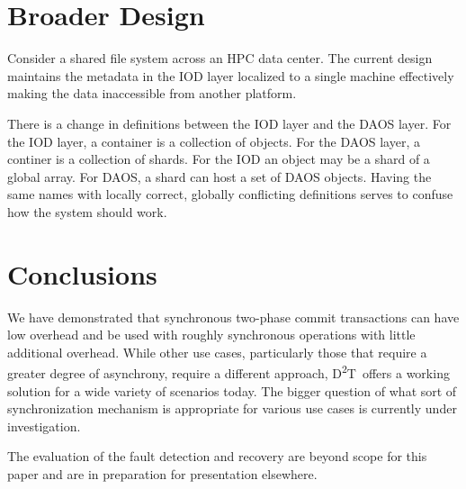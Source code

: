 \documentclass[conference]{sig-alt-gov2}
\newcommand{\DDT}{D\textsuperscript{2}T~}
\begin{document}
\section{Broader Design}
\label{sec:summary}

Consider a shared file system across an HPC data center. The current design
maintains the metadata in the IOD layer localized to a single machine
effectively making the data inaccessible from another platform.

There is a change in definitions between the IOD layer and the DAOS layer.
For the IOD layer, a container is a collection of objects. For the DAOS layer,
a continer is a collection of shards. For the IOD an object may be a shard of
a global array. For DAOS, a shard can host a set of DAOS objects. Having the
same names with locally correct, globally conflicting definitions serves to
confuse how the system should work.

\section{Conclusions}
\label{lab:conclusion}

We have demonstrated that synchronous two-phase commit transactions can have
low overhead and be used with roughly synchronous operations with little
additional overhead. While other use cases, particularly those that require a
greater degree of asynchrony, require a different approach, \DDT offers a
working solution for a wide variety of scenarios today.  The bigger question of
what sort of synchronization mechanism is appropriate for various use cases is
currently under investigation.

The evaluation of the fault detection and recovery are beyond scope for this
paper and are in preparation for presentation elsewhere.
\end{document}
